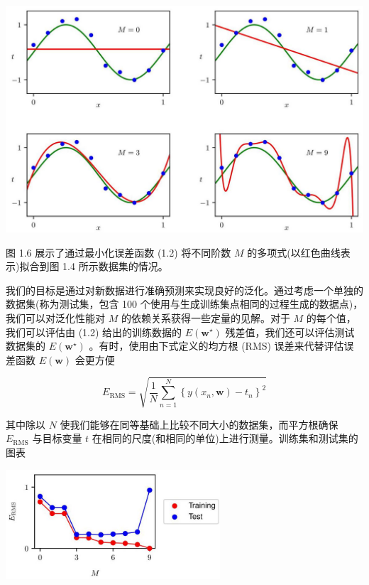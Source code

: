 \documentclass[10pt]{article}
\begin{document}
\begin{center}
\includegraphics[max width=1.0\textwidth]{images/0194e279-9b28-703a-88f4-c3ac21e2010d_29_237_340_1321_836_0.jpg}
\end{center}
\hspace*{3em} 

图 1.6 展示了通过最小化误差函数 (1.2) 将不同阶数 \(M\) 的多项式(以红色曲线表示)拟合到图 1.4 所示数据集的情况。

我们的目标是通过对新数据进行准确预测来实现良好的泛化。通过考虑一个单独的数据集(称为测试集，包含 100 个使用与生成训练集点相同的过程生成的数据点)，我们可以对泛化性能对 \(M\) 的依赖关系获得一些定量的见解。对于 \(M\) 的每个值，我们可以评估由 (1.2) 给出的训练数据的 \(E\left( {\mathbf{w}}^{ \star  }\right)\) 残差值，我们还可以评估测试数据集的 \(E\left( {\mathbf{w}}^{ \star  }\right)\) 。有时，使用由下式定义的均方根 (RMS) 误差来代替评估误差函数 \(E\left( \mathbf{w}\right)\) 会更方便

\[
{E}_{\mathrm{{RMS}}} = \sqrt{\frac{1}{N}\mathop{\sum }\limits_{{n = 1}}^{N}{\left\{  y\left( {x}_{n},\mathbf{w}\right)  - {t}_{n}\right\}  }^{2}} \tag{1.3}
\]

其中除以 \(N\) 使我们能够在同等基础上比较不同大小的数据集，而平方根确保 \({E}_{\mathrm{{RMS}}}\) 与目标变量 \(t\) 在相同的尺度(和相同的单位)上进行测量。训练集和测试集的图表

\begin{center}
\includegraphics[max width=0.6\textwidth]{images/0194e279-9b28-703a-88f4-c3ac21e2010d_30_794_342_754_384_0.jpg}
\end{center}
\hspace*{3em} 
\end{document}

